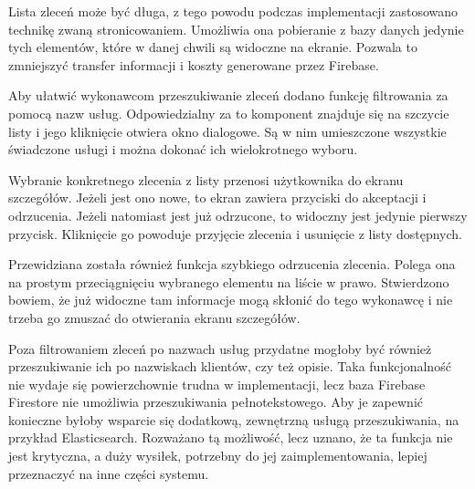 Lista zleceń może być długa, z tego powodu podczas implementacji zastosowano technikę zwaną stronicowaniem. Umożliwia ona pobieranie z bazy danych jedynie tych elementów, które w danej chwili są widoczne na ekranie. Pozwala to zmniejszyć transfer informacji i koszty generowane przez Firebase. 

Aby ułatwić wykonawcom przeszukiwanie zleceń dodano funkcję filtrowania za pomocą nazw usług. Odpowiedzialny za to komponent znajduje się na szczycie listy i jego kliknięcie otwiera okno dialogowe. Są w nim umieszczone wszystkie świadczone usługi i można dokonać ich wielokrotnego wyboru.

Wybranie konkretnego zlecenia z listy przenosi użytkownika do ekranu szczegółów. Jeżeli jest ono nowe, to ekran zawiera przyciski do akceptacji i odrzucenia. Jeżeli natomiast jest już odrzucone, to widoczny jest jedynie pierwszy przycisk. Kliknięcie go powoduje przyjęcie zlecenia i usunięcie z listy dostępnych. 

Przewidziana została również funkcja szybkiego odrzucenia zlecenia. Polega ona na prostym przeciągnięciu wybranego elementu na liście w prawo. Stwierdzono bowiem, że już widoczne tam informacje mogą skłonić do tego wykonawcę i nie trzeba go zmuszać do otwierania ekranu szczegółów.

Poza filtrowaniem zleceń po nazwach usług przydatne mogłoby być również przeszukiwanie ich po nazwiskach klientów, czy też opisie. Taka funkcjonalność nie wydaje się powierzchownie trudna w implementacji, lecz baza Firebase Firestore nie umożliwia przeszukiwania pełnotekstowego. Aby je zapewnić konieczne byłoby wsparcie się dodatkową, zewnętrzną usługą przeszukiwania, na przykład Elasticsearch. Rozważano tą możliwość, lecz uznano, że ta funkcja nie jest krytyczna, a duży wysiłek, potrzebny do jej zaimplementowania, lepiej przeznaczyć na inne części systemu.